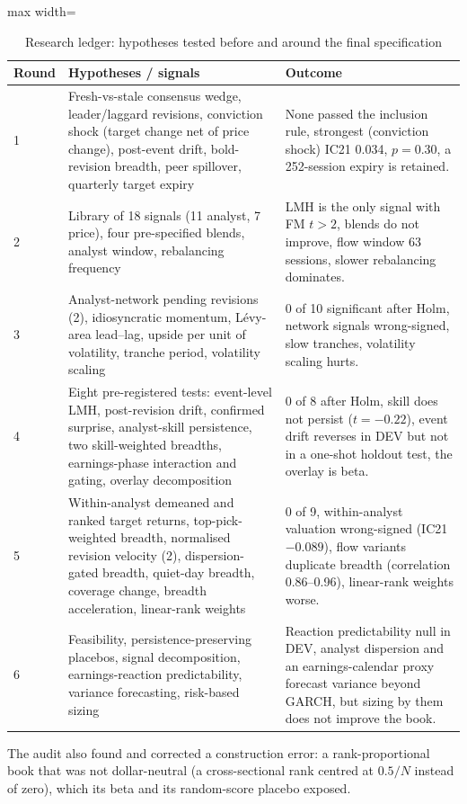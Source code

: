 \begin{table}[t]
\centering\footnotesize
\caption{Research ledger: hypotheses tested before and around the final specification}\label{tab:ledger}
\begin{adjustbox}{max width=\textwidth}\begin{tabular}{p{}p{}p{}}
\toprule
Round & Hypotheses / signals & Outcome\\
\midrule
1 & Fresh-vs-stale consensus wedge, leader/laggard revisions, conviction shock (target change net of price change), post-event drift, bold-revision breadth, peer spillover, quarterly target expiry & None passed the inclusion rule, strongest (conviction shock) IC21 0.034, $p = 0.30$, a 252-session expiry is retained.\\
2 & Library of 18 signals (11 analyst, 7 price), four pre-specified blends, analyst window, rebalancing frequency & LMH is the only signal with FM $t > 2$, blends do not improve, flow window 63 sessions, slower rebalancing dominates.\\
3 & Analyst-network pending revisions (2), idiosyncratic momentum, L\'evy-area lead--lag, upside per unit of volatility, tranche period, volatility scaling & 0 of 10 significant after Holm, network signals wrong-signed, slow tranches, volatility scaling hurts.\\
4 & Eight pre-registered tests: event-level LMH, post-revision drift, confirmed surprise, analyst-skill persistence, two skill-weighted breadths, earnings-phase interaction and gating, overlay decomposition & 0 of 8 after Holm, skill does not persist ($t = -0.22$), event drift reverses in DEV but not in a one-shot holdout test, the overlay is beta.\\
5 & Within-analyst demeaned and ranked target returns, top-pick-weighted breadth, normalised revision velocity (2), dispersion-gated breadth, quiet-day breadth, coverage change, breadth acceleration, linear-rank weights & 0 of 9, within-analyst valuation wrong-signed (IC21 $-0.089$), flow variants duplicate breadth (correlation 0.86--0.96), linear-rank weights worse.\\
6 & Feasibility, persistence-preserving placebos, signal decomposition, earnings-reaction predictability, variance forecasting, risk-based sizing & Reaction predictability null in DEV, analyst dispersion and an earnings-calendar proxy forecast variance beyond GARCH, but sizing by them does not improve the book.\\
\bottomrule
\end{tabular}\end{adjustbox}
\par\smallskip\begin{minipage}{0.95\textwidth}\footnotesize The audit also found and corrected a construction error: a rank-proportional book that was not dollar-neutral (a cross-sectional rank centred at $0.5/N$ instead of zero), which its beta and its random-score placebo exposed.\end{minipage}
\end{table}
